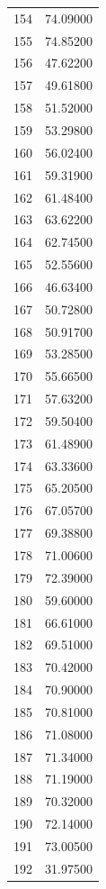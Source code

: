 \documentclass[
  letterpaper,
  DIV=11,
  numbers=noendperiod]{scrreprt}
\begin{document}
\begin{tcolorbox}
\begin{tabular}{lr}
154  &         74.09000 \\
155  &         74.85200 \\
156  &         47.62200 \\
157  &         49.61800 \\
158  &         51.52000 \\
159  &         53.29800 \\
160  &         56.02400 \\
161  &         59.31900 \\
162  &         61.48400 \\
163  &         63.62200 \\
164  &         62.74500 \\
165  &         52.55600 \\
166  &         46.63400 \\
167  &         50.72800 \\
168  &         50.91700 \\
169  &         53.28500 \\
170  &         55.66500 \\
171  &         57.63200 \\
172  &         59.50400 \\
173  &         61.48900 \\
174  &         63.33600 \\
175  &         65.20500 \\
176  &         67.05700 \\
177  &         69.38800 \\
178  &         71.00600 \\
179  &         72.39000 \\
180  &         59.60000 \\
181  &         66.61000 \\
182  &         69.51000 \\
183  &         70.42000 \\
184  &         70.90000 \\
185  &         70.81000 \\
186  &         71.08000 \\
187  &         71.34000 \\
188  &         71.19000 \\
189  &         70.32000 \\
190  &         72.14000 \\
191  &         73.00500 \\
192  &         31.97500 \\

\end{tabular}
\end{tcolorbox}
\end{document}
